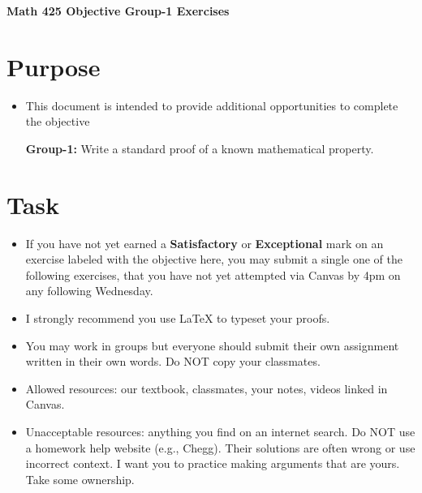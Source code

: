 \documentclass[12pt]{article}
\begin{document}
	\begin{center}
		{\Large \bf Math 425 Objective Group-1 Exercises}
	\end{center}
	\section*{Purpose}
	\begin{itemize}
		\item This document is intended to provide additional opportunities to complete the objective
		
		\textbf{Group-1:} Write a standard proof of a known mathematical property.
	\end{itemize}
	\section*{Task}
	\begin{itemize}
		\item If you have not yet earned a \textbf{Satisfactory} or \textbf{Exceptional} mark on an exercise labeled with the objective here, you may submit a single one of the following exercises, that you have not yet attempted via Canvas by 4pm on any following Wednesday.
		\item I strongly recommend you use LaTeX to typeset your proofs.
		\item You may work in groups but everyone should submit their own assignment written in their own words.  Do NOT copy your classmates.
		\item Allowed resources: our textbook, classmates, your notes, videos linked in Canvas.
		\item Unacceptable resources: anything you find on an internet search. Do NOT use a homework help website (e.g., Chegg). Their solutions are often wrong or use incorrect context.  I want you to practice making arguments that are yours. Take some ownership.
	\end{itemize}
\end{document}
